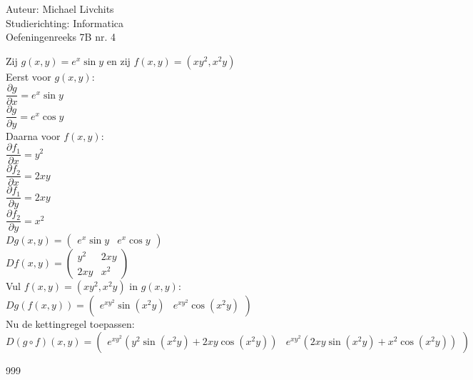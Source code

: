 \documentclass[a4paper]{article}
\begin{document}
  
\noindent \large Auteur: Michael Livchits \\
\noindent \large Studierichting: Informatica\\
\noindent \large Oefeningenreeks 7B nr. 4\\

\medskip

\normalsize

Zij $g(x,y) = e^x\sin y$ en zij $f(x,y) = (xy^2,x^2y)$\\

Eerst voor $g(x,y)$:\\

$\dfrac{\partial g}{\partial x} = e^x\sin y$\\

$\dfrac{\partial g}{\partial y} = e^x\cos y$\\

Daarna voor $f(x,y)$:\\

$\dfrac{\partial f_1}{\partial x} = y^2$\\

$\dfrac{\partial f_2}{\partial x} = 2xy$\\

$\dfrac{\partial f_1}{\partial y} = 2xy$\\

$\dfrac{\partial f_2}{\partial y} = x^2$\\

$Dg(x,y)=\left(\begin{array}{cc}
e^x\sin y & e^x\cos y
\end{array}\right)$\\

$Df(x,y)=\left(\begin{array}{cc}
y^2 & 2xy \\
2xy & x^2
\end{array}\right)$\\

Vul $f(x,y) = (xy^2,x^2y)$ in $g(x,y)$:\\

$Dg(f(x,y))=\left(\begin{array}{cc}
e^{xy^2}\sin (x^2y) & e^{xy^2}\cos (x^2y)
\end{array}\right)$\\

Nu de kettingregel toepassen:\\

$D(g\circ f)(x,y) = \left(\begin{array}{cc}
e^{xy^2}\left(y^2\sin(x^2y)+2xy\cos(x^2y)\right) & e^{xy^2}\left(2xy\sin(x^2y)+x^2\cos(x^2y)\right)
\end{array}\right)$\\

\begin{thebibliography}{999}
\end{thebibliography}
\end{document}

